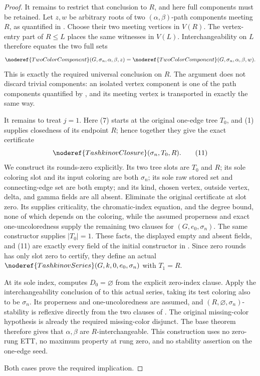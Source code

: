\begin{proof}
It remains to restrict that conclusion to $R$, and here full components
must be retained.  Let $z,w$ be arbitrary roots of two
$(\alpha,\beta)$-path components meeting $R$, as quantified in
.  Choose their two meeting vertices in
$V(R)$.  The vertex-entry part of $R\leq L$ places the same witnesses in
$V(L)$.  Interchangeability on $L$ therefore equates the two full sets
\[
 \noderef{TwoColorComponent}(G,\sigma_n,\alpha,\beta,z)
 =
 \noderef{TwoColorComponent}(G,\sigma_n,\alpha,\beta,w).
\]
This is exactly the required universal conclusion on $R$.  The argument
does not discard trivial components: an isolated vertex component is one
of the path components quantified by , and
its meeting vertex is transported in exactly the same way.

It remains to treat $j=1$.  Here (7) starts at the original one-edge tree
$T_0$, and (1) supplies closedness of its endpoint $R$; hence together
they give the exact certificate
\[
                    \noderef{TashkinovClosure}(\sigma_n,T_0,R). \tag{11}
\]
We construct its rounds-zero  explicitly.
Its two tree slots are $T_0$ and $R$; its sole coloring slot and its input
coloring are both $\sigma_n$; its sole raw stored set and connecting-edge
set are both empty; and its kind, chosen vertex, outside vertex, delta,
and gamma fields are all absent.  Eliminate the original certificate at
slot zero.  Its
 supplies criticality, the chromatic-index equation, and
the degree bound, none of which depends on the coloring, while the assumed
properness and exact one-uncoloredness supply the remaining two clauses
for $(G,e_0,\sigma_n)$.  The same constructor supplies
$|T_0|=1$.  These facts, the displayed empty and absent fields, and (11)
are exactly every field of the initial constructor in
.  Since zero rounds has only slot zero to
certify, they define an actual
$\noderef{TashkinovSeries}(G,k,0,e_0,\sigma_n)$ with $T_1=R$.

At its sole index,  computes
$D_0=\varnothing$ from the explicit zero-index clause.  Apply the
interchangeability conclusion of  to this
actual series, taking its test coloring also to be $\sigma_n$.  Its
properness and one-uncoloredness are assumed, and
$(R,\varnothing,\sigma_n)$-stability is reflexive directly from the two
clauses of .  The original missing-color
hypothesis is already the required missing-color disjunct.  The base
theorem therefore gives that $\alpha,\beta$ are $R$-interchangeable.
This construction uses no zero-rung ETT, no maximum property at rung zero,
and no stability assertion on the one-edge seed.

Both cases prove the required implication.
\end{proof}
